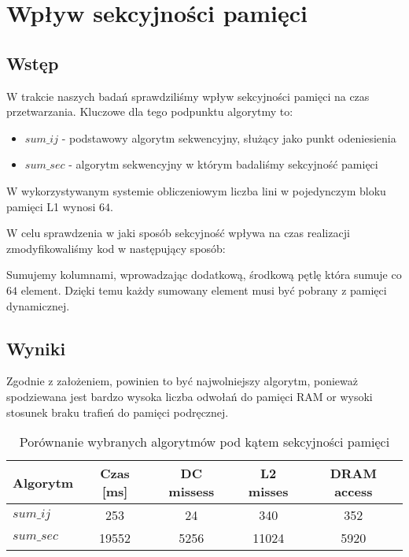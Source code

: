 \section{Wpływ sekcyjności pamięci}

\subsection{Wstęp}

W trakcie naszych badań sprawdziliśmy wpływ sekcyjności pamięci na czas przetwarzania. Kluczowe dla tego podpunktu algorytmy to:

\begin{itemize}
\item $sum\_ij$ - podstawowy algorytm sekwencyjny, służący jako punkt odeniesienia
\item $sum\_sec$ - algorytm sekwencyjny w którym badaliśmy sekcyjność pamięci
\end{itemize}

W wykorzystywanym systemie obliczeniowym liczba lini w pojedynczym bloku pamięci L1 wynosi $64$.\newline

W celu sprawdzenia w jaki sposób sekcyjność wpływa na czas realizacji zmodyfikowaliśmy kod w następujący sposób:



Sumujemy kolumnami, wprowadzając dodatkową, środkową pętlę która sumuje co $64$ element. Dzięki temu każdy sumowany element musi być pobrany z pamięci dynamicznej.


\subsection{Wyniki}

Zgodnie z założeniem, powinien to być najwolniejszy algorytm, ponieważ spodziewana jest bardzo wysoka liczba odwołań do pamięci RAM or wysoki stosunek braku trafień do pamięci podręcznej.

\begin{table}[H]
\caption{Porównanie wybranych algorytmów pod kątem sekcyjności pamięci}

\begin{tabular}{|l|c|c|c|c|}

\hline
  Algorytm &
  Czas [ms] &
  DC missess &
  L2 misses &
  DRAM access \\

\hline
  $sum\_ij$ &
  253 &
  24 &
  340 &
  352 \\

\hline
  $sum\_sec$ &
  19552 &
  5256 &
  11024 &
  5920 \\

\hline

\end{tabular}
\end{table}

